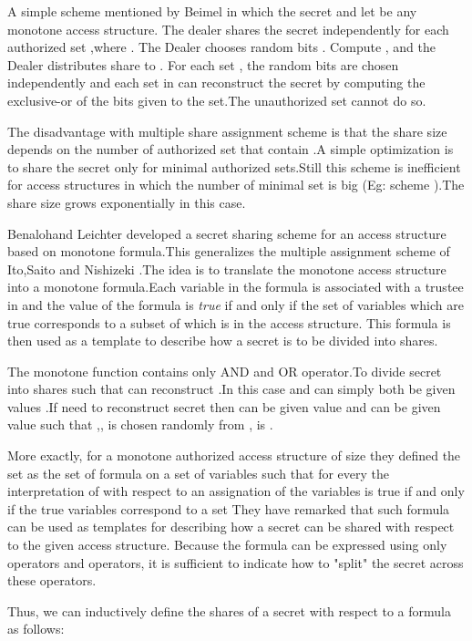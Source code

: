 \documentclass{llncs}
\begin{document}
A simple scheme mentioned by Beimel \cite{beimel2011secret} in which the secret  and let  be any monotone access structure. The dealer shares the secret independently for each authorized set
,where .     
The Dealer chooses  random bits .
Compute , and the Dealer distributes share  to .
For each set , the random bits are chosen independently and each set in  can reconstruct the secret by computing the exclusive-or of the bits given to the set.The unauthorized set cannot do so.
    
The disadvantage with multiple share assignment scheme is that the share size depends on the number of authorized set that contain .A simple optimization is to share the secret  only for minimal authorized sets.Still this scheme is inefficient for access structures in which the number of minimal set is big (Eg: scheme ).The share size grows exponentially in this case.
     
Benalohand Leichter \cite{benaloh1990generalized} developed a secret sharing scheme for an access structure based on monotone formula.This generalizes the multiple assignment scheme of Ito,Saito and Nishizeki \cite{ito1989secret}.The idea is to translate the monotone access structure into a monotone formula.Each variable in the formula is associated with a trustee in  and the value of the formula is \textit{true} if and only if the set of variables which are true corresponds to a subset of  which is in the access structure. This formula is then used as a template to describe how a secret is to be divided into shares.
    
The monotone function contains only AND and OR operator.To divide secret  into shares such that   can reconstruct .In this case  and   can simply both be given values .If  need to reconstruct secret then  can be given value  and  can be given value  such that ,, is chosen randomly from , is .
    
More exactly, for a monotone authorized access structure  of size  they defined the set  as the set of formula on a set of variables  such that for every  the interpretation of  with respect to an assignation of the variables is true if and only if the true variables correspond to a set  They have remarked that such formula can be used as templates for describing how a secret can be shared with respect to the given access structure. Because the formula can be expressed using only  operators and  operators, it is sufficient to indicate how to "split" the secret across these operators.

Thus, we can inductively define the shares of a secret  with respect to a formula  as follows:
\end{document}
